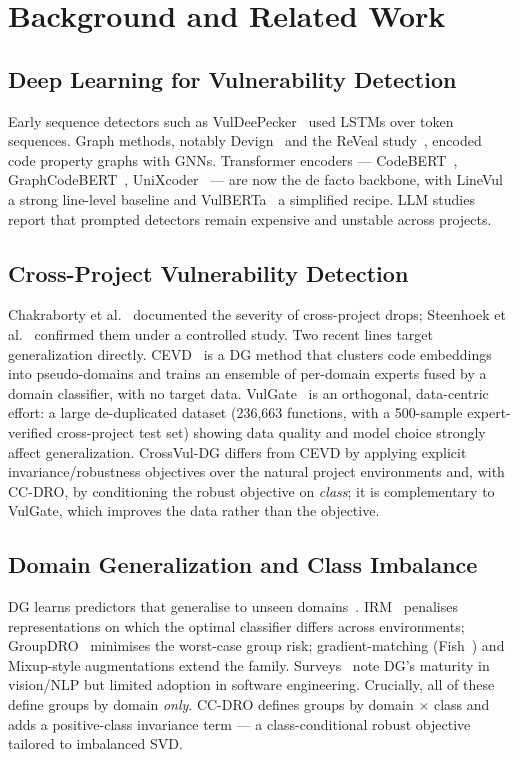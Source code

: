 \documentclass[conference]{IEEEtran}
\begin{document}
\section{Background and Related Work}
\subsection{Deep Learning for Vulnerability Detection}
Early sequence detectors such as VulDeePecker~\cite{vuldeepecker}
used LSTMs over token sequences. Graph methods, notably
Devign~\cite{devign} and the ReVeal study~\cite{reveal}, encoded
code property graphs with GNNs. Transformer encoders ---
CodeBERT~\cite{codebert}, GraphCodeBERT~\cite{graphcodebert},
UniXcoder~\cite{unixcoder} --- are now the de facto backbone, with
LineVul~\cite{linevul} a strong line-level baseline and
VulBERTa~\cite{vulberta} a simplified recipe. LLM
studies~\cite{vulbench} report that prompted detectors remain
expensive and unstable across projects.

\subsection{Cross-Project Vulnerability Detection}
Chakraborty et al.~\cite{reveal} documented the severity of
cross-project drops; Steenhoek et al.~\cite{steenhoek} confirmed
them under a controlled study. Two recent lines target
generalization directly. CEVD~\cite{cevd} is a DG method that
clusters code embeddings into pseudo-domains and trains an
ensemble of per-domain experts fused by a domain classifier, with
no target data. VulGate~\cite{vulgate} is an orthogonal,
data-centric effort: a large de-duplicated dataset (236,663
functions, with a 500-sample expert-verified cross-project test
set) showing data quality and model choice strongly affect
generalization. CrossVul-DG differs from CEVD by applying explicit
invariance/robustness objectives over the natural project
environments and, with CC-DRO, by conditioning the robust
objective on \emph{class}; it is complementary to VulGate, which
improves the data rather than the objective.

\subsection{Domain Generalization and Class Imbalance}
DG learns predictors that generalise to unseen
domains~\cite{muandet}. IRM~\cite{irm} penalises representations
on which the optimal classifier differs across environments;
GroupDRO~\cite{dro} minimises the worst-case group risk;
gradient-matching (Fish~\cite{fish}) and Mixup-style augmentations
extend the family. Surveys~\cite{dgsurvey1,dgsurvey2} note DG's
maturity in vision/NLP but limited adoption in software
engineering. Crucially, all of these define groups by domain
\emph{only}. CC-DRO defines groups by domain $\times$ class and
adds a positive-class invariance term --- a class-conditional
robust objective tailored to imbalanced SVD.
\end{document}
